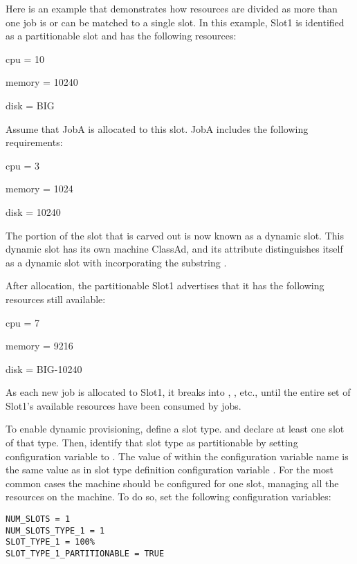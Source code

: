Here is an example that demonstrates how resources are divided
as more than one job
is or can be matched to a single slot.
In this example, Slot1 is identified as a partitionable slot
and has the following resources:
\begin{description}
  \item{cpu = 10}
  \item{memory = 10240}
  \item{disk = BIG}
\end{description}
Assume that JobA is allocated to this slot.
JobA includes the following requirements:
\begin{description}
  \item{cpu = 3}
  \item{memory = 1024}
  \item{disk = 10240} 
\end{description}
The portion of the slot that is carved out is now
known as a dynamic slot.
This dynamic slot has its own machine ClassAd, 
and its  attribute
distinguishes itself as a dynamic slot with incorporating the substring
.

After allocation, the partitionable Slot1 advertises that it has
the following resources still available:
\begin{description}
  \item{cpu = 7}
  \item{memory = 9216}
  \item{disk = BIG-10240}
\end{description}
As each new job is allocated to Slot1,
it breaks into , ,  etc.,
until the entire set of
Slot1's available resources have been consumed by jobs.

To enable dynamic provisioning, 
define a slot type. 
and declare at least one slot of that type.
Then,
identify that slot type as partitionable by setting
configuration variable 
to .
The value of  within the configuration variable name
is the same value as in slot type definition configuration variable
.
For the most common cases the machine should
be configured for one slot, managing all the resources on the machine.
To do so, set the following configuration variables:

\begin{verbatim}
NUM_SLOTS = 1
NUM_SLOTS_TYPE_1 = 1
SLOT_TYPE_1 = 100%
SLOT_TYPE_1_PARTITIONABLE = TRUE
\end{verbatim}


